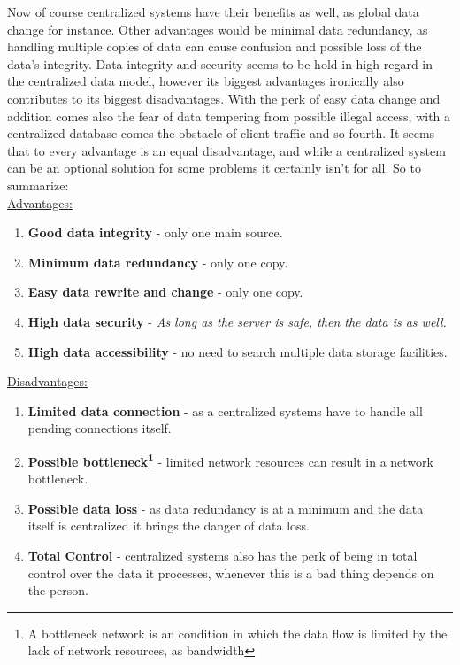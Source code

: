 \documentclass[paper=a4, fontsize=11pt]{scrartcl} %
\numberwithin{equation}{section} %
\numberwithin{figure}{section} %
\numberwithin{table}{section} %
\begin{document}
Now of course centralized systems have their benefits as well, as global data change for instance. Other advantages would be minimal data redundancy, as handling multiple copies of data can cause confusion and possible loss of the data's integrity\cite{centralized}. Data integrity and security seems to be hold in high regard in the centralized data model, however its biggest advantages ironically also contributes to its biggest disadvantages. With the perk of easy data change and addition comes also the fear of data tempering from possible illegal access, with a centralized database comes the obstacle of client traffic and so fourth\cite{compare}. It seems that to every advantage is an equal disadvantage, and while a centralized system can be an optional solution for some problems it certainly isn't for all. So to summarize:\\

\underline{Advantages:}

\begin{enumerate}
\item \textbf{Good data integrity} - only one main source.
\item \textbf{Minimum data redundancy} - only one copy.
\item \textbf{Easy data rewrite and change} - only one copy.
\item \textbf{High data security} - \textit{As long as the server is safe, then the data is as well.}
\item \textbf{High data accessibility} - no need to search multiple data storage facilities.
\end{enumerate}

\underline{Disadvantages:}
 
\begin{enumerate}
\item \textbf{Limited data connection} - as a centralized systems have to handle all pending connections itself. 
\item \textbf{Possible bottleneck\footnote{A bottleneck network is an condition in which the data flow is limited by the lack of network resources, as bandwidth\cite{bottleneck}}} - limited network resources can result in a network bottleneck.
\item \textbf{Possible data loss} - as data redundancy is at a minimum and the data itself is centralized it brings the danger of data loss.
\item \textbf{Total Control} - centralized systems also has the perk of being in total control over the data it processes, whenever this is a bad thing depends on the person. 
\end{enumerate}
\end{document}
